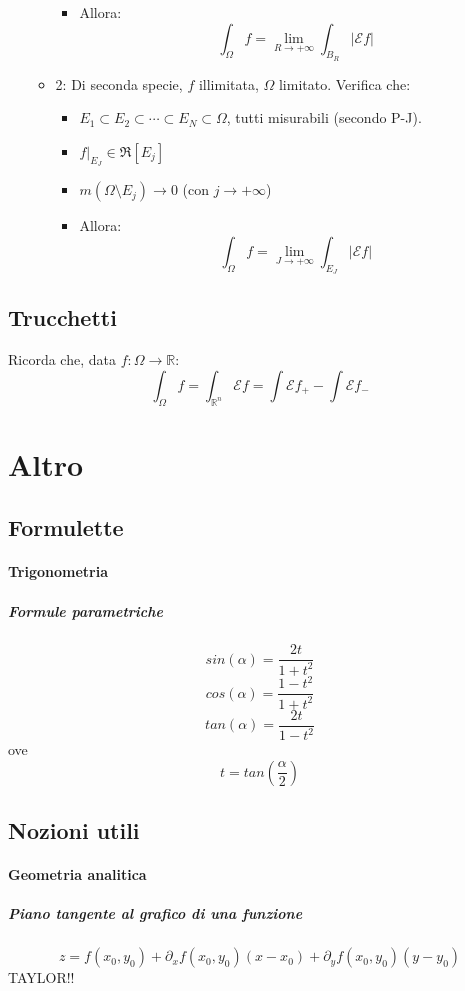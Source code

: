 \documentclass[a4paper,12pt]{book}
\begin{document}
\begin{itemize}
\begin{itemize}
\begin{itemize}
   \item Allora: $$\int_\Omega f = \lim_{R \to +\infty} \int_{B_R} |\mathcal{E}f| $$
  \end{itemize}
  \item 2: Di seconda specie, $f$ illimitata, $\Omega$ limitato. Verifica che:
  \begin{itemize}
   \item $E_1 \subset E_2 \subset \cdots \subset E_N \subset \Omega$, tutti misurabili (secondo P-J).
   \item $f|_{E_J} \in \Re[E_j]$
   \item $m(\Omega\setminus E_j) \to 0$ (con $j \to +\infty$)
   \item Allora: $$\int_\Omega f = \lim_{J \to +\infty} \int_{E_J} |\mathcal{E}f|$$
  \end{itemize}
 \end{itemize}
\end{itemize}

\subsection{Trucchetti}
Ricorda che, data $f: \Omega \rightarrow \mathbb{R}$:
 $$\int_\Omega f = \int_{\mathbb{R}^n} \mathcal{E}f = \int \mathcal{E}f_+ - \int \mathcal{E}f_- $$

\section{Altro}
\subsection{Formulette}
\paragraph{Trigonometria}
\subparagraph{Formule parametriche}
$$sin(\alpha) = \frac{2t}{1+t^2}$$
$$cos(\alpha) = \frac{1-t^2}{1+t^2}$$
$$tan(\alpha) = \frac{2t}{1-t^2}$$
ove $$t = tan\left(\frac{\alpha}{2}\right)$$
\subsection{Nozioni utili}
\paragraph{Geometria analitica}
\subparagraph{Piano tangente al grafico di una funzione}
$$z = f(x_0, y_0) + \partial_x f(x_0, y_0) (x-x_0) + \partial_y f(x_0, y_0) (y - y_0) $$
TAYLOR!!
\end{document}
